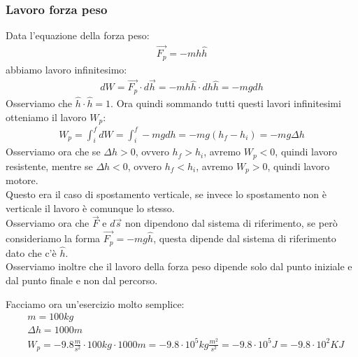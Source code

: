        \subsubsection{Lavoro forza peso}
            Data l'equazione della forza peso:
            \begin{align*}
                \vec{F_p}=-mh\hat{h}
            \end{align*}
            abbiamo lavoro infinitesimo:
            \begin{align*}
                dW=\vec{F_p}\cdot d\vec{h}=-mh\hat{h}\cdot dh\hat{h}=-mgdh
            \end{align*}
            Osserviamo che $\hat{h}\cdot\hat{h}=1$.
            Ora quindi sommando tutti questi lavori infinitesimi otteniamo il lavoro $W_p$:
            \begin{align*}
                W_p=\int_i^f dW=\int_i^f -mgdh=-mg(h_f-h_i)=-mg\Delta h
            \end{align*}
            Osserviamo ora che se $\Delta h>0$, ovvero $h_f>h_i$, avremo $W_p<0$, quindi lavoro resistente, mentre se $\Delta h<0$, ovvero $h_f<h_i$, avremo $W_p>0$, quindi lavoro motore.\\
            Questo era il caso di spostamento verticale, se invece lo spostamento non è verticale il lavoro è comunque lo stesso.\\
            Osserviamo ora che $\vec{F}$ e $d\vec{s}$ non dipendono dal sistema di riferimento, se però consideriamo la forma $\vec{F_p}=-mg\hat{h}$, questa dipende dal sistema di riferimento dato che c'è $\hat{h}$.\\
            Osserviamo inoltre che il lavoro della forza peso dipende solo dal punto iniziale e dal punto finale e non dal percorso.
            \begin{mdframed}
                Facciamo ora un'esercizio molto semplice:
                \begin{align*}
                    &m = 100kg\\
                    &\Delta h = 1000m\\
                    &W_p=-9.8\frac{m}{s^2}\cdot 100kg \cdot 1000m =-9.8\cdot 10^5kg\frac{m^2}{s^2}=-9.8\cdot 10^5J=-9.8\cdot 10^2KJ
                \end{align*}
            \end{mdframed}

